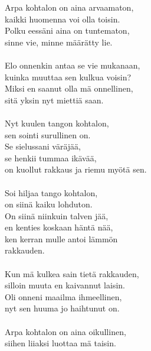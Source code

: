 
        Arpa kohtalon on aina arvaamaton, \\
        kaikki huomenna voi olla toisin. \\
        Polku eessäni aina on tuntematon, \\
        sinne vie, minne määrätty lie. \\
\hspace{10mm} \\
        Elo onnenkin antaa se vie mukanaan, \\
        kuinka muuttaa sen kulkua voisin? \\
        Miksi en saanut olla mä onnellinen, \\
        sitä yksin nyt miettiä saan. \\
\hspace{10mm} \\
        Nyt kuulen tangon kohtalon, \\
        sen sointi surullinen on. \\
        Se sielussani väräjää, \\
        se henkii tummaa ikävää, \\
        on kuollut rakkaus ja riemu myötä sen. \\
\hspace{10mm} \\
        Soi hiljaa tango kohtalon, \\
        on siinä kaiku lohduton. \\
        On siinä niinkuin talven jää, \\
        en kenties koskaan häntä nää, \\
        ken kerran mulle antoi lämmön \\
        rakkauden. \\
\hspace{10mm} \\
        Kun mä kulkea sain tietä rakkauden, \\
        silloin muuta en kaivannut laisin. \\
        Oli onneni maailma ihmeellinen, \\
        nyt sen huuma jo haihtunut on. \\
\hspace{10mm} \\
        Arpa kohtalon on aina oikullinen, \\
        siihen liiaksi luottaa mä taisin. \\
